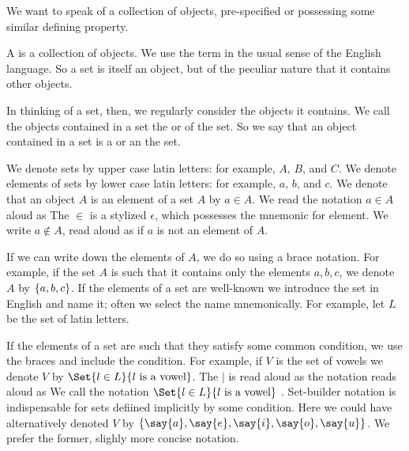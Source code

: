 
\sbasic



\sstart



We want to speak of a collection of objects,
pre-specified or possessing some similar
defining property.


A  is a collection of objects.
We use the term  in the
usual sense of the English language.
So a set is itself an object, but of the peculiar nature
that it contains other objects.

In thinking of a set, then, we regularly consider the
objects it contains.
We call the objects contained in a set the
 or
 of the set.
So we say that an object contained in a set is a
 or an
 the set.


We denote sets by upper case latin letters: for example, $A$, $B$, and $C$.
We denote elements of sets by lower case latin letters: for example, $a$, $b$, and $c$.
We denote that an object $A$ is an element of a set $A$ by $a \in A$.
We read the notation $a \in A$ aloud as 
The $\in$ is a stylized $\epsilon$, which possesses the mnemonic for element.
We write $a \not\in A$, read aloud as  if $a$ is not an element of $A$.

If we can write down the elements of $A$, we do so using a brace notation.
For example, if the set $A$ is such that it contains only the elements $a, b, c$, we denote $A$ by $\{a, b, c\}$.
If the elements of a set are well-known we introduce the set in English and name it; often we select the name mnemonically.
For example, let $L$ be the set of latin letters.

If the elements of a set are such that they satisfy some common condition, we use the braces and include the condition.
For example, if $V$ is the set of vowels we denote $V$ by $\Set{l \in L}{l \text{ is a vowel}}$.
The $\mid$ is read aloud as  the notation reads aloud as 
We call the notation $\Set{l \in L}{l \text{ is a vowel}}$ .
Set-builder notation is indispensable for sets defiined implicitly by some condition.
Here we could have alternatively denoted $V$ by $\set{\say{a},\say{e},\say{i},\say{o},\say{u}}$.
We prefer the former, slighly more concise notation.

